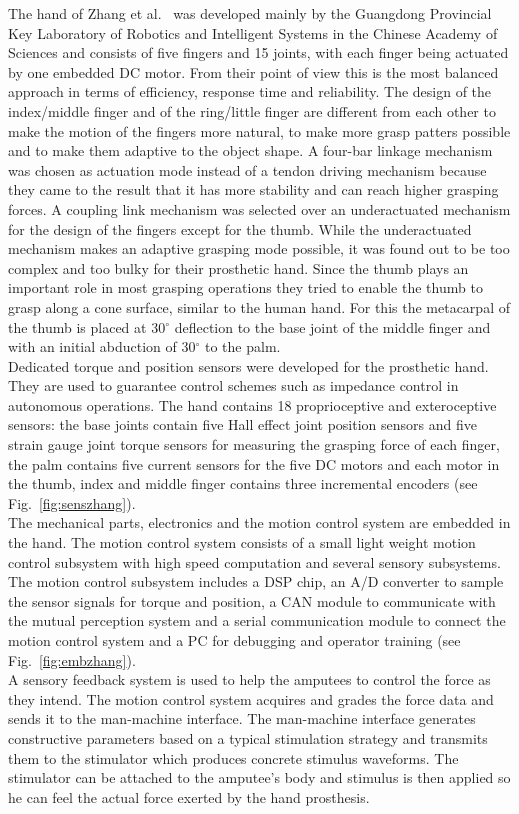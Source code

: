 \documentclass[a4paper, 10pt, conference]{ieeeconf}      %
\begin{document}
The hand of Zhang et al.~\cite{zhang} was developed mainly by the Guangdong Provincial Key Laboratory of Robotics and Intelligent Systems in the Chinese Academy of Sciences and consists of five fingers and 15 joints, with each finger being actuated by one embedded DC motor. From their point of view this is the most balanced approach in terms of efficiency, response time and reliability. The design of the index/middle finger and of the ring/little finger are different from each other to make the motion of the fingers more natural, to make more grasp patters possible and to make them adaptive to the object shape. A four-bar linkage mechanism was chosen as actuation mode instead of a tendon driving mechanism because they came to the result that it has more stability and can reach higher grasping forces. A coupling link mechanism was selected over an underactuated mechanism for the design of the fingers except for the thumb. While the underactuated mechanism makes an adaptive grasping mode possible, it was found out to be too complex and too bulky for their prosthetic hand. Since the thumb plays an important role in most grasping operations they tried to enable the thumb to grasp along a cone surface, similar to the human hand. For this the metacarpal of the thumb is placed at 30$^\circ$ deflection to the base joint of the middle finger and with an initial abduction of 30$^\circ$ to the palm.\\
Dedicated torque and position sensors were developed for the prosthetic hand. They are used to guarantee control schemes such as impedance control in autonomous operations. The hand contains 18 proprioceptive and exteroceptive sensors: the base joints contain five Hall effect joint position sensors and five strain gauge joint torque sensors for measuring the grasping force of each finger, the palm contains five current sensors for the five DC motors and each motor in the thumb, index and middle finger contains three incremental encoders (see Fig.~\ref{fig:senszhang}).\\
The mechanical parts, electronics and the motion control system are embedded in the hand. The motion control system consists of a small light weight motion control subsystem with high speed computation and several sensory subsystems. The motion control subsystem includes a DSP chip, an A/D converter to sample the sensor signals for torque and position, a CAN module to communicate with the mutual perception system and a serial communication module to connect the motion control system and a PC for debugging and operator training (see Fig.~\ref{fig:embzhang}).\\
A sensory feedback system is used to help the amputees to control the force as they intend. The motion control system acquires and grades the force data and sends it to the man-machine interface. The man-machine interface generates constructive parameters based on a typical stimulation strategy and transmits them to the stimulator which produces concrete stimulus waveforms. The stimulator can be attached to the amputee's body and stimulus is then applied so he can feel the actual force exerted by the hand prosthesis.
\end{document}
